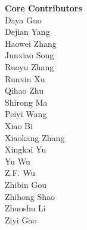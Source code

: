 \documentclass[11pt, a4paper, logo, copyright, nonumbering]{deepseek}
\begin{document}
{\begin{multicols}{2} %
\noindent
\textbf{\color{damaired} Core Contributors} \\
\color{damaired} Daya Guo \\
\color{damaired} Dejian Yang \\
\color{damaired} Haowei Zhang \\
\color{damaired} Junxiao Song \\
\color{damaired} Ruoyu Zhang \\
\color{damaired} Runxin Xu \\
\color{damaired} Qihao Zhu \\
\color{damaired} Shirong Ma \\
\color{damaired} Peiyi Wang \\
\color{damaired} Xiao Bi \\
\color{damaired} Xiaokang Zhang \\
\color{damaired} Xingkai Yu \\
\color{damaired} Yu Wu \\
\color{damaired} Z.F. Wu \\
\color{damaired} Zhibin Gou \\
\color{damaired} Zhihong Shao \\
\color{damaired} Zhuoshu Li \\
\color{damaired} Ziyi Gao \\


\end{multicols}}
\end{document}

